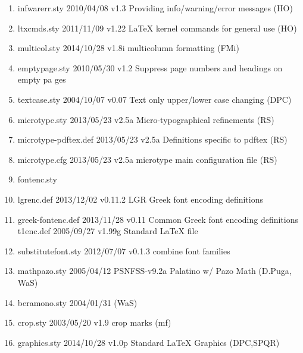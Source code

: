 \begin{enumerate}
\item infwarerr.sty 2010/04/08 v1.3 Providing info/warning/error messages (HO)
\item ltxcmds.sty 2011/11/09 v1.22 LaTeX kernel commands for general use (HO)
\item multicol.sty 2014/10/28 v1.8i multicolumn formatting (FMi)
\item emptypage.sty 2010/05/30 v1.2 Suppress page numbers and headings on empty pa
ges
\item textcase.sty 2004/10/07 v0.07 Text only upper/lower case changing (DPC)
\item microtype.sty 2013/05/23 v2.5a Micro-typographical refinements (RS)
\item microtype-pdftex.def 2013/05/23 v2.5a Definitions specific to pdftex (RS)
\item microtype.cfg 2013/05/23 v2.5a microtype main configuration file (RS)
\item fontenc.sty
\item lgrenc.def  2013/12/02 v0.11.2 LGR Greek font encoding definitions
\item greek-fontenc.def 2013/11/28 v0.11 Common Greek font encoding definitions
t1enc.def 2005/09/27 v1.99g Standard LaTeX file
\item substitutefont.sty 2012/07/07 v0.1.3 combine font families
\item mathpazo.sty 2005/04/12 PSNFSS-v9.2a Palatino w/ Pazo Math (D.Puga, WaS) 
\item beramono.sty 2004/01/31 (WaS)
\item crop.sty 2003/05/20 v1.9 crop marks (mf)
\item graphics.sty 2014/10/28 v1.0p Standard LaTeX Graphics (DPC,SPQR)

\end{enumerate}

